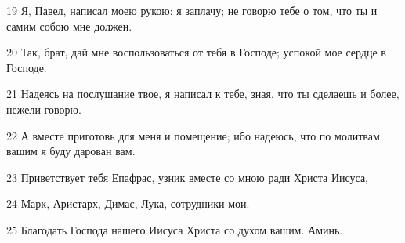 \par 19 Я, Павел, написал моею рукою: я заплачу; не говорю тебе о том, что ты и самим собою мне должен.
\par 20 Так, брат, дай мне воспользоваться от тебя в Господе; успокой мое сердце в Господе.
\par 21 Надеясь на послушание твое, я написал к тебе, зная, что ты сделаешь и более, нежели говорю.
\par 22 А вместе приготовь для меня и помещение; ибо надеюсь, что по молитвам вашим я буду дарован вам.
\par 23 Приветствует тебя Епафрас, узник вместе со мною ради Христа Иисуса,
\par 24 Марк, Аристарх, Димас, Лука, сотрудники мои.
\par 25 Благодать Господа нашего Иисуса Христа со духом вашим. Аминь.


